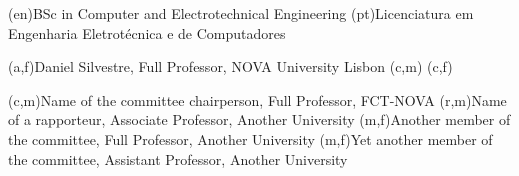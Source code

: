 \ntauthordegree(en){BSc in Computer and Electrotechnical Engineering}
\ntauthordegree(pt){Licenciatura em Engenharia Eletrotécnica e de Computadores}






(a,f){Daniel Silvestre, Full Professor, NOVA University Lisbon}
(c,m){}
(c,f){}



(c,m){Name of the committee chairperson, Full Professor, FCT-NOVA}
(r,m){Name of a rapporteur, Associate Professor, Another University}
(m,f){Another member of the committee, Full Professor, Another University}
(m,f){Yet another member of the committee, Assistant Professor, Another University}

